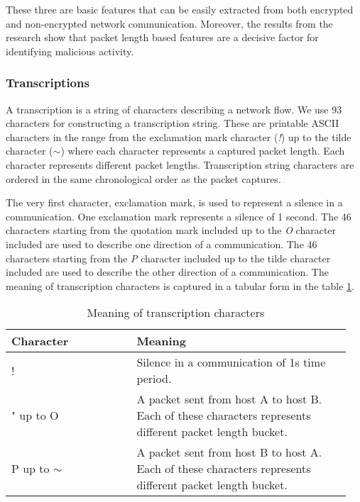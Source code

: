 \documentclass{article}
\begin{document}
These three are basic features that can be easily extracted from both encrypted and non-encrypted network communication. Moreover, the results from the research \cite{meghdouri2018analysis} show that packet length based features are a decisive factor for identifying malicious activity.




\subsubsection{Transcriptions}\label{sec-transcriptions}

A transcription is a string of characters describing a network flow. We use 93 characters for constructing a transcription string. These are printable ASCII characters in the range from the exclamation mark character (\textit{!}) up to the tilde character (\textit{$\sim$}) where each character represents a captured packet length. Each character represents different packet lengths. Transcription string characters are ordered in the same chronological order as the packet captures.

The very first character, exclamation mark, is used to represent a silence in a communication. One exclamation mark represents a silence of 1 second. The 46 characters starting from the quotation mark included up to the \textit{O} character included are used to describe one direction of a communication. The 46 characters starting from the \textit{P} character included up to the tilde character included are used to describe the other direction of a communication. The meaning of transcription characters is captured in a tabular form in the table \ref{tab:character-meanings}.

\begin{table}[h!]
\centering
\begin{tabular}{ |p{0.35\linewidth} | p{0.6\linewidth}| }
 \hline
 Character & Meaning \\
 \hline \hline
 ! & Silence in a communication of 1s time period. \\
 \hline
 " up to O & A packet sent from host A to host B. Each of these characters represents different packet length bucket. \\
 \hline
 P up to $\sim$ & A packet sent from host B to host A. Each of these characters represents different packet length bucket. \\
 \hline
\end{tabular}
\caption{Meaning of transcription characters}
\label{tab:character-meanings}
\end{table}
\end{document}
